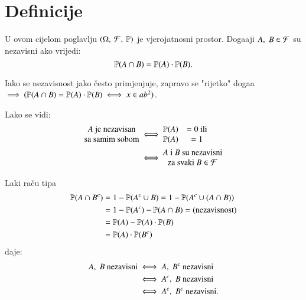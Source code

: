 
\chapter{Definicije}

U ovom cijelom poglavlju $(\Omega, \: \mathcal{F}, \: \mathbb{P})$ je vjerojatnosni prostor.
Doga\dj aji $A, \; B \in \mathcal{F}$ su nezavisni ako vrijedi:
\begin{equation*}
    \mathbb{P}({A \cap B}) = \mathbb{P}({A}) \cdot \mathbb{P}({B}).
\end{equation*}

\begin{pr}  \label{pr:6.1}
    Iako se nezavisnost jako \v cesto primjenjuje, zapravo se "rijetko" doga\dj a
    $\implies (\mathbb{P}({A \cap B}) = \mathbb{P}({A}) \cdot \mathbb{P}({B}) \iff x \in a b^2)$.
\end{pr}

Lako se vidi:\\
\begin{align}   \label{jed:6.2}
    \begin{split}
        \begin{matrix}
            A \textnormal{ je nezavisan}\\
            \textnormal{sa samim sobom}
        \end{matrix}
        &\iff
        \begin{matrix}
            \mathbb{P}({A}) &= 0 \textnormal{ ili}\\
            \mathbb{P}({A}) &= 1
        \end{matrix} \\
        &\iff
        \begin{matrix}
            \textnormal{$A$ i $B$ su nezavisni}\\
            \textnormal{za svaki } B \in \mathcal{F}
        \end{matrix}
    \end{split}
\end{align}

Laki ra\v cu tipa
\begin{align*}
    \mathbb{P}({A \cap B^c}) &= 1 - \mathbb{P}({A^c \cup B}) = 1 - \mathbb{P}({A^c \cup (A \cap B)})\\
    &= 1 - \mathbb{P}({A^c}) - \mathbb{P}({A \cap B}) = (\textnormal{nezavisnost})\\
    &= \mathbb{P}({A}) - \mathbb{P}({A}) \cdot \mathbb{P}({B})\\
    &= \mathbb{P}({A}) \cdot \mathbb{P}({B^c})
\end{align*}
daje:
\begin{align}   \label{jed:6.3}
    \begin{split}
        A, \; B \textnormal{ nezavisni} &\iff A, \; B^c \textnormal{ nezavisni}\\
        &\iff A^c, \; B \textnormal{ nezavisni}\\
        &\iff A^c, \; B^c \textnormal{ nezavisni}.
    \end{split}
\end{align}

